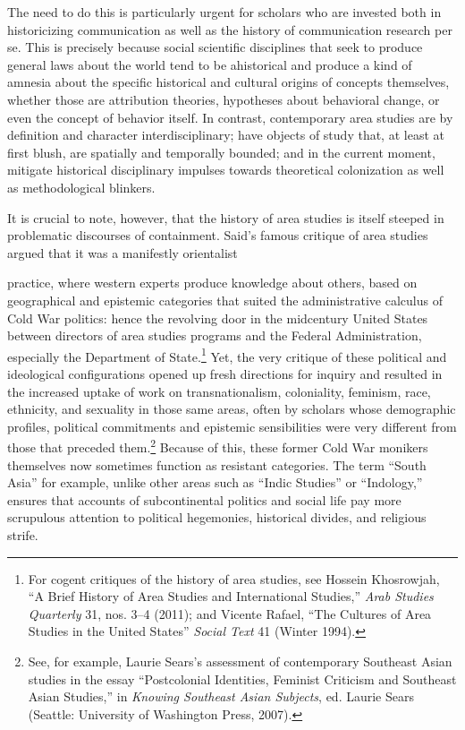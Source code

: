 \documentclass{tufte-handout}
\begin{document}
\begin{titlepage}
The need to do this is particularly urgent for scholars who are invested
both in historicizing communication as well as the history of
communication research per se. This is precisely because social
scientific disciplines that seek to produce general laws about the world
tend to be ahistorical and produce a kind of amnesia about the specific
historical and cultural origins of concepts themselves, whether those
are attribution theories, hypotheses about behavioral change, or even
the concept of behavior itself. In contrast, contemporary area studies
are by definition and character interdisciplinary; have objects of study
that, at least at first blush, are spatially and temporally bounded; and
in the current moment, mitigate historical disciplinary impulses towards
theoretical colonization as well as methodological blinkers.

It is crucial to note, however, that the history of area studies is
itself steeped in problematic discourses of containment. Said's famous
critique of area studies argued that it was a manifestly orientalist


\enlargethispage{2\baselineskip}

\vspace*{2em}





 \end{titlepage}



\noindent practice, where western experts produce knowledge about others, based on
geographical and epistemic categories that suited the administrative
calculus of Cold War politics: hence the revolving door in the
midcentury United States between directors of area studies programs and
the Federal Administration, especially the Department of
State.\footnote{For cogent critiques of the history of area studies, see
  Hossein Khosrowjah, ``A Brief History of Area Studies and
  International Studies,'' \emph{Arab Studies Quarterly} 31, nos. 3--4
  (2011); and Vicente Rafael, ``The Cultures of Area Studies in the
  United States'' \emph{Social Text} 41 (Winter 1994).} Yet, the very
critique of these political and ideological configurations opened up
fresh directions for inquiry and resulted in the increased uptake of
work on transnationalism, coloniality, feminism, race, ethnicity, and
sexuality in those same areas, often by scholars whose demographic
profiles, political commitments and epistemic sensibilities were very
different from those that preceded them.\footnote{See, for example,
  Laurie Sears's assessment of contemporary Southeast Asian studies in
  the essay ``Postcolonial Identities, Feminist Criticism and Southeast
  Asian Studies,'' in \emph{Knowing Southeast Asian Subjects}, ed.
  Laurie Sears (Seattle: University of Washington Press, 2007).} Because
of this, these former Cold War monikers themselves now sometimes
function as resistant categories. The term ``South Asia'' for example,
unlike other areas such as ``Indic Studies'' or ``Indology,'' ensures
that accounts of subcontinental politics and social life pay more
scrupulous attention to political hegemonies, historical divides, and
religious strife.
\end{document}
